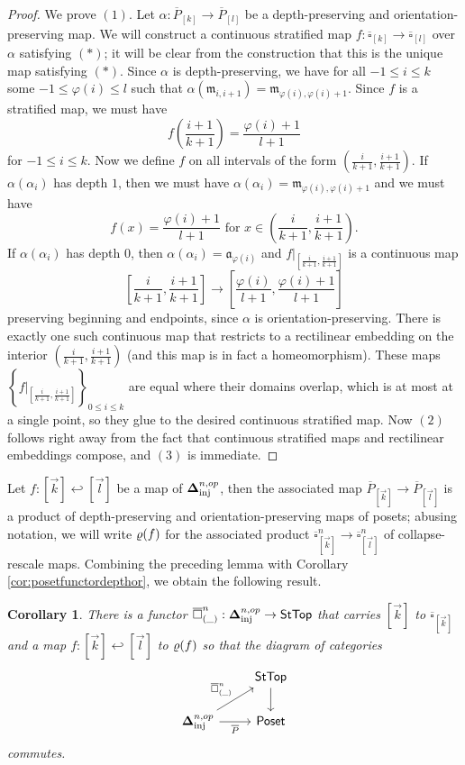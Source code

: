 \documentclass[10pt, reqno, twoside
, final
]{amsart}
\numberwithin{equation}{subsection}%
\theoremstyle{definition}
\theoremstyle{definition}
\theoremstyle{definition}
\theoremstyle{definition}
\theoremstyle{definition}
\theoremstyle{definition}
\theoremstyle{definition}
\theoremstyle{definition}
\theoremstyle{definition}
\theoremstyle{plain}
\theoremstyle{definition}
\theoremstyle{plain}
\theoremstyle{definition}
\theoremstyle{plain}
\newtheorem{cor}[defn]{Corollary}
\theoremstyle{definition}
\theoremstyle{definition}
\theoremstyle{plain}
\theoremstyle{plain}
\theoremstyle{definition}
\theoremstyle{plain}
\theoremstyle{plain}
\theoremstyle{plain}
\begin{document}
\begin{proof}
We prove $(1)$. Let $\alpha:\overline{P}_{[k]}\rightarrow \overline{P}_{[l]}$ be a depth-preserving and orientation-preserving map. We will construct a continuous stratified map $f:\overline{\square}_{[k]}\rightarrow \overline{\square}_{[l]}$ over $\alpha$ satisfying $(*)$; it will be clear from the construction that this is the unique map satisfying $(*)$. Since $\alpha$ is depth-preserving, we have for all $-1\leq i\leq k$ some $-1\leq \varphi(i)\leq l$ such that $\alpha(\mathfrak{m}_{i,i+1})=\mathfrak{m}_{\varphi(i),\varphi(i)+1}$. Since $f$ is a stratified map, we must have 
\[ f\left(\frac{i+1}{k+1}\right) = \frac{\varphi(i)+1}{l+1} \]
for $-1\leq i\leq k$. Now we define $f$ on all intervals of the form $\left(\frac{i}{k+1},\frac{i+1}{k+1}\right)$. If $\alpha(\alpha_i)$ has depth $1$, then we must have $\alpha(\alpha_i)=\mathfrak{m}_{\varphi(i),\varphi(i)+1}$ and we must have 
\[  f(x) = \frac{\varphi(i)+1}{l+1} \text{ for }x\in \left(\frac{i}{k+1},\frac{i+1}{k+1}\right).   \]
If $\alpha(\alpha_i)$ has depth $0$, then $\alpha(\alpha_i)=\mathfrak{a}_{\varphi(i)}$ and $f|_{\left[\frac{i}{k+1},\frac{i+1}{k+1}\right]}$ is a continuous map
\[ \left[\frac{i}{k+1},\frac{i+1}{k+1}\right]\longrightarrow \left[\frac{\varphi(i)}{l+1},\frac{\varphi(i)+1}{l+1}\right]\]
preserving beginning and endpoints, since $\alpha$ is orientation-preserving. There is exactly one such continuous map that restricts to a rectilinear embedding on the interior $\left(\frac{i}{k+1},\frac{i+1}{k+1}\right)$ (and this map is in fact a homeomorphism). These maps $\left\{f|_{\left[\frac{i}{k+1},\frac{i+1}{k+1}\right]}\right\}_{0\leq i\leq k}$ are equal where their domains overlap, which is at most at a single point, so they glue to the desired continuous stratified map. Now $(2)$ follows right away from the fact that continuous stratified maps and rectilinear embeddings compose, and $(3)$ is immediate.
\end{proof}
Let $f:[\vec{k}]\hookleftarrow [\vec{l}]$ be a map of $\boldsymbol{\Delta}^{n,op}_{\mathrm{inj}}$, then the associated map $\overline{P}_{[\vec{k}]}\rightarrow \overline{P}_{[\vec{l}]}$ is a product of depth-preserving and orientation-preserving maps of posets; abusing notation, we will write $\varrho(f)$ for the associated product $\overline{\square}^n_{[\vec{k}]}\rightarrow \overline{\square}^n_{[\vec{l}]}$ of collapse-rescale maps. Combining the preceding lemma with Corollary \ref{cor:posetfunctordepthor}, we obtain the following result.
\begin{cor}
There is a functor $\overline{\square}^n_{(\_)}:\boldsymbol{\Delta}^{n,op}_{\mathrm{inj}}\rightarrow \mathsf{StTop}$ that carries $[\vec{k}]$ to $\overline{\square}_{[\vec{k}]}$ and a map $f:[\vec{k}]\hookleftarrow [\vec{l}]$ to $\varrho(f)$ so that the diagram of categories
\[
\begin{tikzcd}
    & \mathsf{StTop} \ar[d] \\
    \simpopnin \ar[ur,"\overline{\square}^n_{(\_)}"] \ar[r,"\overline{P}"']& \mathsf{Poset}
\end{tikzcd}
\]
commutes.
\end{cor}
\end{document}
